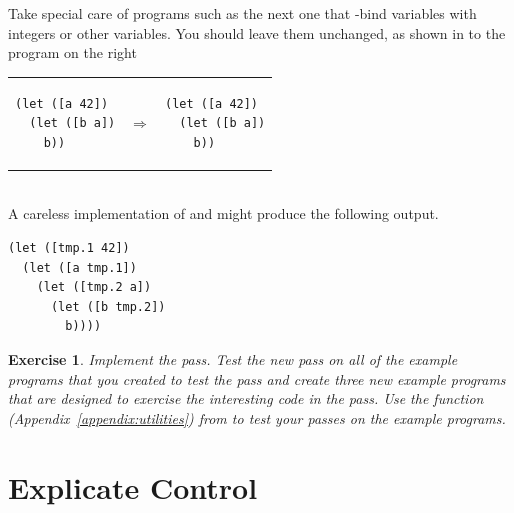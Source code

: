 \documentclass[11pt]{book}
\newtheorem{exercise}[theorem]{Exercise}
\begin{document}
Take special care of programs such as the next one that -bind
variables with integers or other variables. You should leave them
unchanged, as shown in to the program on the right \\
\begin{tabular}{lll}
\begin{minipage}{0.4\textwidth}
\begin{lstlisting}
(let ([a 42])
  (let ([b a])
    b))
\end{lstlisting}
\end{minipage}
&
$\Rightarrow$
&
\begin{minipage}{0.4\textwidth}
\begin{lstlisting}
(let ([a 42])
  (let ([b a])
    b))
\end{lstlisting}
\end{minipage}
\end{tabular} \\
A careless implementation of  and  might
produce the following output.\\
\begin{minipage}{0.4\textwidth}
\begin{lstlisting}
(let ([tmp.1 42])
  (let ([a tmp.1])
    (let ([tmp.2 a])
      (let ([b tmp.2])
        b))))
\end{lstlisting}
\end{minipage}

\begin{exercise}
\normalfont Implement the  pass.
Test the new pass on all of the example programs that you created to test the
 pass and create three new example programs that are
designed to exercise the interesting code in the
 pass. Use the  function
(Appendix~\ref{appendix:utilities}) from  to test
your passes on the example programs.
\end{exercise}


\section{Explicate Control}
\label{sec:explicate-control-r1}
\end{document}
